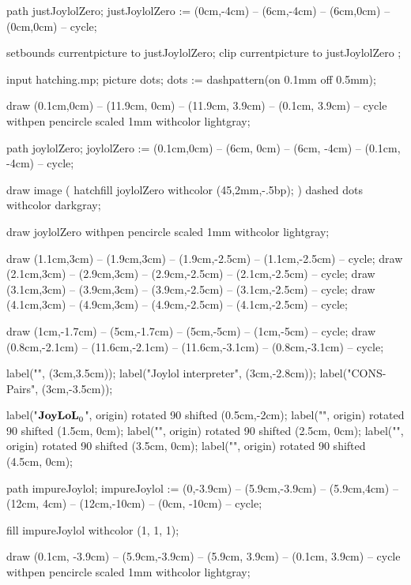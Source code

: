 path justJoylolZero;
justJoylolZero := (0cm,-4cm) -- (6cm,-4cm) -- (6cm,0cm) -- (0cm,0cm) -- cycle;

setbounds currentpicture to justJoylolZero;
clip currentpicture to justJoylolZero ;
\stopMPcode\egroup

\bgroup\startMPcode
input hatching.mp;
picture dots; dots := dashpattern(on 0.1mm off 0.5mm);


draw (0.1cm,0cm) -- (11.9cm, 0cm) -- (11.9cm, 3.9cm) -- (0.1cm, 3.9cm) -- cycle
  withpen pencircle scaled 1mm
  withcolor lightgray;

path joylolZero;
joylolZero := (0.1cm,0cm) -- (6cm, 0cm) --
  (6cm, -4cm) -- (0.1cm, -4cm) -- cycle;

draw image (
  hatchfill joylolZero
    withcolor (45,2mm,-.5bp);
) dashed dots withcolor darkgray;

draw joylolZero
  withpen pencircle scaled 1mm
  withcolor lightgray;


draw (1.1cm,3cm) -- (1.9cm,3cm) -- (1.9cm,-2.5cm) -- (1.1cm,-2.5cm) -- cycle;
draw (2.1cm,3cm) -- (2.9cm,3cm) -- (2.9cm,-2.5cm) -- (2.1cm,-2.5cm) -- cycle;
draw (3.1cm,3cm) -- (3.9cm,3cm) -- (3.9cm,-2.5cm) -- (3.1cm,-2.5cm) -- cycle;
draw (4.1cm,3cm) -- (4.9cm,3cm) -- (4.9cm,-2.5cm) -- (4.1cm,-2.5cm) -- cycle;

draw (1cm,-1.7cm) -- (5cm,-1.7cm) -- (5cm,-5cm) -- (1cm,-5cm) -- cycle;
draw (0.8cm,-2.1cm) -- (11.6cm,-2.1cm) -- (11.6cm,-3.1cm) -- (0.8cm,-3.1cm) -- cycle;


label("", (3cm,3.5cm));
label("Joylol interpreter", (3cm,-2.8cm));
label("CONS-Pairs", (3cm,-3.5cm));

label("$\bold{JoyLoL}_0$", origin) rotated 90 shifted (0.5cm,-2cm);
label("", origin) rotated 90 shifted (1.5cm, 0cm);
label("", origin) rotated 90 shifted (2.5cm, 0cm);
label("", origin) rotated 90 shifted (3.5cm, 0cm);
label("", origin) rotated 90 shifted (4.5cm, 0cm);

path impureJoylol;
impureJoylol := (0,-3.9cm) -- (5.9cm,-3.9cm) -- (5.9cm,4cm) -- (12cm, 4cm) --
  (12cm,-10cm) -- (0cm, -10cm) -- cycle;

fill impureJoylol withcolor (1, 1, 1);

draw (0.1cm, -3.9cm) -- (5.9cm,-3.9cm) -- (5.9cm, 3.9cm) -- (0.1cm, 3.9cm) -- cycle
  withpen pencircle scaled 1mm
  withcolor lightgray;
  

